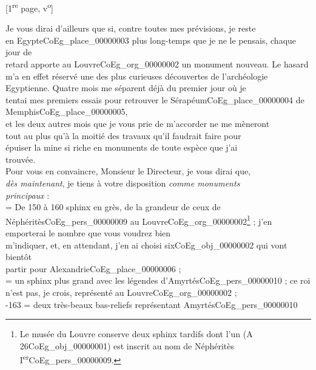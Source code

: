 \documentclass{book}
\begin{document}
{\footnotesize \begin{center} {[1\textsuperscript{re} page, v\textsuperscript{o}]}\end{center}}
\indent Je vous dirai d’ailleurs que si, contre toutes mes prévisions, je reste\\
en Egypte\gls{CoEg_place_00000003} plus long-temps que je ne le pensais, chaque jour de\\
retard apporte au Louvre\gls{CoEg_org_00000002} un monument nouveau. Le hasard\\
m’a en effet réservé une des plus curieuses découvertes de l’archéologie\\
Egyptienne. Quatre mois me séparent déjà du premier jour où je\\
tentai mes premiers essais pour retrouver le Sérapéum\gls{CoEg_place_00000004} de Memphis\gls{CoEg_place_00000005},\\
et les deux autres mois que je vous prie de m’accorder ne me mèneront\\
tout au plus qu’à la moitié des travaux qu’il faudrait faire pour\\
épuiser la mine si riche en monuments de toute espèce que j’ai\\
trouvée.\\
\indent Pour vous en convaincre, Monsieur le Directeur, je vous dirai que,\\
\textit{dès maintenant}, je tiens à votre disposition \textit{comme monuments\\
principaux} :\\
 = De 150 à 160 sphinx en grès, de la grandeur de ceux de\\
Néphéritès\gls{CoEg_pers_00000009} au Louvre\gls{CoEg_org_00000002}\footnote{Le musée du Louvre conserve deux sphinx tardifs dont l'un (A 26\gls{CoEg_obj_00000001}) est inscrit au nom de Néphéritès I\textsuperscript{er}\gls{CoEg_pers_00000009}.} ; j’en emporterai le nombre que vous voudrez bien\\
m’indiquer, et, en attendant, j’en ai choisi six\gls{CoEg_obj_00000002} qui vont bientôt\\
partir pour Alexandrie\gls{CoEg_place_00000006} ;\\
 = un sphinx plus grand avec les légendes d’Amyrtés\gls{CoEg_pers_00000010} ; ce roi\\
n’est pas, je crois, représenté au Louvre\gls{CoEg_org_00000002} ;\\
-163 = deux très-beaux bas-reliefs représentant Amyrtés\gls{CoEg_pers_00000010}\\
\end{document}
